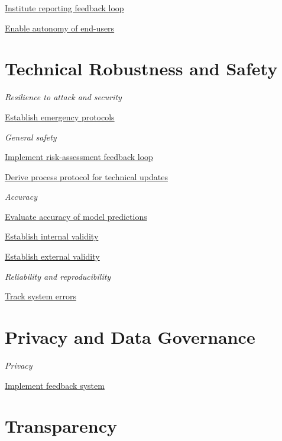 \documentclass[
  letterpaper,
  DIV=11,
  numbers=noendperiod]{scrreport}
\begin{document}
\protect\hyperlink{institute-reporting-feedback-loop}{Institute
reporting feedback loop}

\protect\hyperlink{enable-autonomy-of-end-users}{Enable autonomy of
end-users}

\hypertarget{technical-robustness-and-safety-2}{%
\section*{Technical Robustness and
Safety}\label{technical-robustness-and-safety-2}}


\emph{Resilience to attack and security}

\protect\hyperlink{establish-emergency-protocols}{Establish emergency
protocols}

\emph{General safety}

\protect\hyperlink{implement-risk-assessment-feedback-loop}{Implement
risk-assessment feedback loop}

\protect\hyperlink{derive-process-protocol-for-technical-updates}{Derive
process protocol for technical updates}

\emph{Accuracy}

\protect\hyperlink{evaluate-accuracy-of-model-predictions}{Evaluate
accuracy of model predictions}

\protect\hyperlink{establish-internal-validity}{Establish internal
validity}

\protect\hyperlink{establish-external-validity}{Establish external
validity}

\emph{Reliability and reproducibility}

\protect\hyperlink{track-system-errors}{Track system errors}

\hypertarget{privacy-and-data-governance-2}{%
\section*{Privacy and Data
Governance}\label{privacy-and-data-governance-2}}


\emph{Privacy}

\protect\hyperlink{implement-feedback-system}{Implement feedback system}

\hypertarget{transparency-1}{%
\section*{Transparency}\label{transparency-1}}
\end{document}
